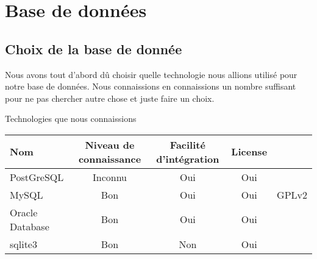 \documentclass[a4paper, 11pt]{article}
\begin{document}
\section{Base de données}
\subsection{Choix de la base de donnée}
	Nous avons tout d'abord dû choisir quelle technologie nous allions utilisé pour notre base de données.
	Nous connaissions en connaissions un nombre suffisant pour ne pas chercher autre chose et juste faire un choix.
	\par
	\begin{center}
		Technologies que nous connaissions
		\par
		\begin{tabular}{|l|c|c|c|c|}
			\hline
			Nom & Niveau de connaissance & Facilité d'intégration & License \\
			\hline
			PostGreSQL & Inconnu & Oui & Oui\\
			\hline
			MySQL & Bon & Oui & Oui & GPLv2\\
			\hline
			Oracle Database & Bon & Oui & Oui \\
			\hline
			sqlite3 & Bon & Non & Oui \\
			\hline
		\end{tabular}
	\end{center}
\end{document}
